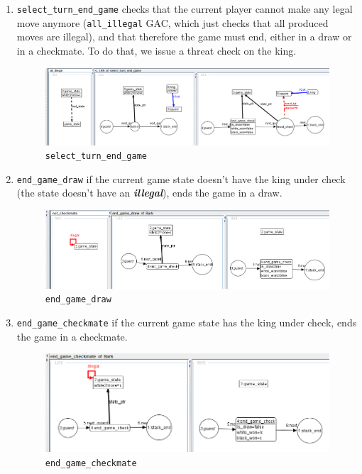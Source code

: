 \documentclass[a4paper, 10pt]{scrartcl}
\newcommand{\edgerepr}[1]{\textit{\textbf{#1}}}
\newcommand{\illegal}{\edgerepr{illegal}}
\begin{document}
    \begin{enumerate}
        \item \texttt{select\_turn\_end\_game} checks that the current player cannot make any legal move anymore (\texttt{all\_illegal} GAC, which just checks that all produced moves are illegal), and that therefore the game must end, either in a draw or in a checkmate. To do that, we issue a threat check on the king.
        \begin{figure}[H]
            \centering
            \includegraphics[width=.8\linewidth]{images/select_turn_end_game.png}
            \caption{\texttt{select\_turn\_end\_game}}
        \end{figure}
        \item \texttt{end\_game\_draw} if the current game state doesn't have the king under check (the state doesn't have an \illegal), ends the game in a draw.
        \begin{figure}[H]
            \centering
            \includegraphics[width=.8\linewidth]{images/end_game_draw.png}
            \caption{\texttt{end\_game\_draw}}
        \end{figure}
        \item \texttt{end\_game\_checkmate} if the current game state has the king under check, ends the game in a checkmate.
        \begin{figure}[H]
            \centering
            \includegraphics[width=.8\linewidth]{images/end_game_checkmate.png}
            \caption{\texttt{end\_game\_checkmate}}
        \end{figure}
    \end{enumerate}
\end{document}
